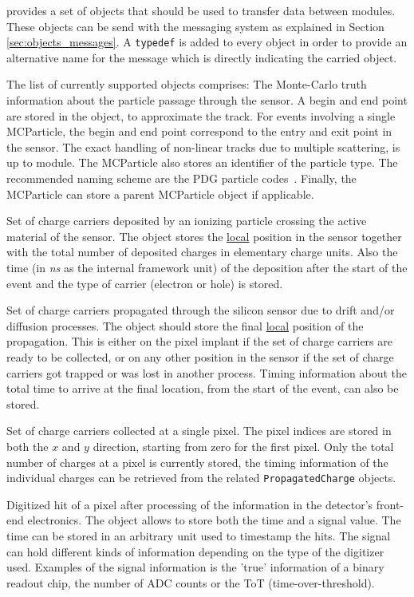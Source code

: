 \apsq provides a set of objects that should be used to transfer data between modules.
These objects can be send with the messaging system as explained in Section \ref{sec:objects_messages}.
A \texttt{typedef} is added to every object in order to provide an alternative name for the message which is directly indicating the carried object.

The list of currently supported objects comprises:
The Monte-Carlo truth information about the particle passage through the sensor.
A begin and end point are stored in the object, to approximate the track.
For events involving a single MCParticle, the begin and end point correspond to the entry and exit point in the sensor.
The exact handling of non-linear tracks due to multiple scattering, is up to module.
The MCParticle also stores an identifier of the particle type.
The recommended naming scheme are the PDG particle codes~\cite{pdg}.
Finally, the MCParticle can store a parent MCParticle object if applicable.

Set of charge carriers deposited by an ionizing particle crossing the active material of the sensor.
The object stores the \underline{local} position in the sensor together with the total number of deposited charges in elementary charge units.
Also the time (in \textit{ns} as the internal framework unit) of the deposition after the start of the event and the type of carrier (electron or hole) is stored.

Set of charge carriers propagated through the silicon sensor due to drift and/or diffusion processes.
The object should store the final \underline{local} position of the propagation.
This is either on the pixel implant if the set of charge carriers are ready to be collected, or on any other position in the sensor if the set of charge carriers got trapped or was lost in another process.
Timing information about the total time to arrive at the final location, from the start of the event, can also be stored.

Set of charge carriers collected at a single pixel.
The pixel indices are stored in both the $x$ and $y$ direction, starting from zero for the first pixel.
Only the total number of charges at a pixel is currently stored, the timing information of the individual charges can be retrieved from the related \texttt{PropagatedCharge} objects.

Digitized hit of a pixel after processing of the information in the detector's front-end electronics.
The object allows to store both the time and a signal value.
The time can be stored in an arbitrary unit used to timestamp the hits.
The signal can hold different kinds of information depending on the type of the digitizer used.
Examples of the signal information is the 'true' information of a binary readout chip, the number of ADC counts or the ToT (time-over-threshold).
